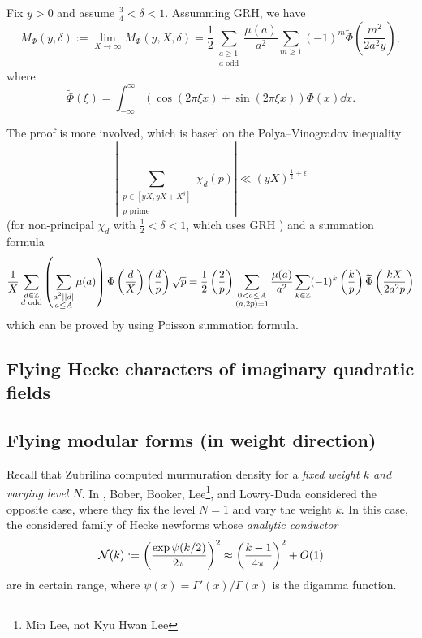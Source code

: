 \begin{theorem}
    Fix $y > 0$ and assume $\frac{3}{4} < \delta < 1$.
    Assumming GRH, we have
    \begin{equation}
        M_{\Phi} (y, \delta) := \lim_{X \to \infty} M_{\Phi}(y, X, \delta) = \frac{1}{2} \sum_{\substack{a \ge 1 \\ a \text{ odd}}} \frac{\mu(a)}{a^2} \sum_{m \ge 1} (-1)^{m} \widetilde{\Phi} \left(\frac{m^2}{2 a^2 y}\right),
    \end{equation}
    where
    \begin{equation}
        \widetilde{\Phi}(\xi) = \int_{-\infty}^{\infty} (\cos(2 \pi \xi x) + \sin(2 \pi \xi x)) \Phi(x) \dd x.
    \end{equation}
\end{theorem}
The proof is more involved, which is based on the Polya--Vinogradov inequality 
\[
\left|\sum_{\substack{p \in [yX, yX + X^\delta] \\ p\text{ prime}}} \chi_d(p)\right| \ll (yX)^{\frac{1}{2} + \epsilon}
\]
(for non-principal $\chi_d$ with $\frac{1}{2} < \delta < 1$, which uses GRH \cite{granville2007large})
and a summation formula
\[
\frac{1}{X} \sum_{\substack{d \in \mathbb{Z} \\ d \text{ odd}}} \left(\sum_{\substack{a^2 | |d| \\ a \le A}} \mu(a)\right) \Phi\left(\frac{d}{X}\right) \left(\frac{d}{p}\right) \sqrt{p} = \frac{1}{2} \left(\frac{2}{p}\right) \sum_{\substack{0 < a \le A \\ (a, 2p) = 1}} \frac{\mu(a)}{a^2} \sum_{k \in \mathbb{Z}} (-1)^k \left(\frac{k}{p}\right) \widetilde{\Phi} \left(\frac{k X}{2 a^2 p}\right)
\]
which can be proved by using Poisson summation formula.


\subsection{Flying Hecke characters of imaginary quadratic fields}

\cite{wang2025murmurations}

\subsection{Flying modular forms (in weight direction)}

Recall that Zubrilina computed murmuration density for a \emph{fixed weight $k$ and varying level $N$}.
In \cite{bober2023murmurations}, Bober, Booker, Lee\footnote{Min Lee, not Kyu Hwan Lee}, and Lowry-Duda considered the opposite case, where they fix the level $N = 1$ and vary the weight $k$.
In this case, the considered family of Hecke newforms whose \emph{analytic conductor}
\[
\mathcal{N}(k) := \left(\frac{\exp \psi(k/2)}{2 \pi}\right)^2 \approx \left(\frac{k-1}{4 \pi}\right)^2 + O(1)
\]
are in certain range, where $\psi(x) = \Gamma'(x)/\Gamma(x)$ is the digamma function.

